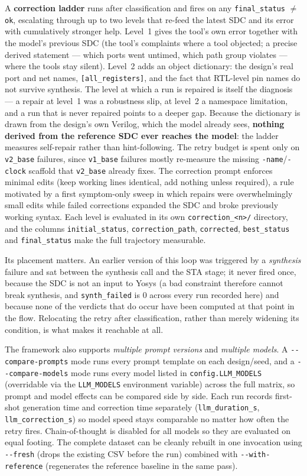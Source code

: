 \documentclass[11pt]{article}
\begin{document}
A \textbf{correction ladder} runs after classification and fires on any \texttt{final\_status} $\neq$ \texttt{ok}, escalating through up to two levels that re-feed the latest SDC and its error with cumulatively stronger help. Level~1 gives the tool's own error together with the model's previous SDC (the tool's complaints where a tool objected; a precise derived statement --- which ports went untimed, which path group violates --- where the tools stay silent). Level~2 adds an object dictionary: the design's real port and net names, \texttt{[all\_registers]}, and the fact that RTL-level pin names do not survive synthesis. The level at which a run is repaired is itself the diagnosis --- a repair at level~1 was a robustness slip, at level~2 a namespace limitation, and a run that is never repaired points to a deeper gap. Because the dictionary is drawn from the design's own Verilog, which the model already sees, \textbf{nothing derived from the reference SDC ever reaches the model}: the ladder measures self-repair rather than hint-following. The retry budget is spent only on \texttt{v2\_base} failures, since \texttt{v1\_base} failures mostly re-measure the missing \texttt{-name}/\texttt{-clock} scaffold that \texttt{v2\_base} already fixes. The correction prompt enforces minimal edits (keep working lines identical, add nothing unless required), a rule motivated by a first symptom-only sweep in which repairs were overwhelmingly small edits while failed corrections expanded the SDC and broke previously working syntax. Each level is evaluated in its own \texttt{correction\_<n>/} directory, and the columns \texttt{initial\_status}, \texttt{correction\_path}, \texttt{corrected}, \texttt{best\_status} and \texttt{final\_status} make the full trajectory measurable.

Its placement matters. An earlier version of this loop was triggered by a \emph{synthesis} failure and sat between the synthesis call and the STA stage; it never fired once, because the SDC is not an input to Yosys (a bad constraint therefore cannot break synthesis, and \texttt{synth\_failed} is $0$ across every run recorded here) and because none of the verdicts that do occur have been computed at that point in the flow. Relocating the retry after classification, rather than merely widening its condition, is what makes it reachable at all.

The framework also supports \emph{multiple prompt versions} and \emph{multiple models}. A \texttt{-{}-compare-prompts} mode runs every prompt template on each design/seed, and a \texttt{-{}-compare-models} mode runs every model listed in \texttt{config.LLM\_MODELS} (overridable via the \texttt{LLM\_MODELS} environment variable) across the full matrix, so prompt and model effects can be compared side by side. Each run records first-shot generation time and correction time separately (\texttt{llm\_duration\_s}, \texttt{llm\_correction\_s}) so model speed stays comparable no matter how often the retry fires. Chain-of-thought is disabled for all models so they are evaluated on equal footing. The complete dataset can be cleanly rebuilt in one invocation using \texttt{-{}-fresh} (drops the existing CSV before the run) combined with \texttt{-{}-with-reference} (regenerates the reference baseline in the same pass).
\end{document}
